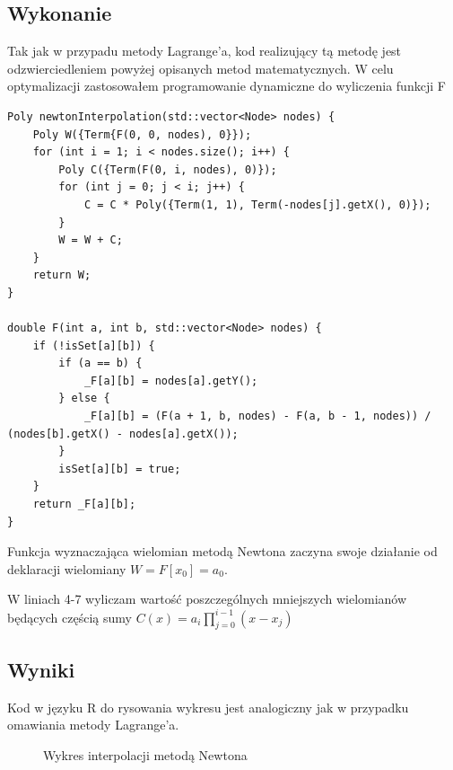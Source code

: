 \documentclass{article}
\begin{document}
    \subsection{Wykonanie}
    Tak jak w przypadu metody Lagrange'a, kod realizujący tą metodę jest odzwierciedleniem powyżej opisanych metod matematycznych. 
    W celu optymalizacji zastosowałem programowanie dynamiczne do wyliczenia funkcji F 
    \lstset {language=C++}
    \begin{lstlisting}[caption={Interpolacja metodą Newtona}]
Poly newtonInterpolation(std::vector<Node> nodes) {
    Poly W({Term{F(0, 0, nodes), 0}});
    for (int i = 1; i < nodes.size(); i++) {
        Poly C({Term(F(0, i, nodes), 0)});
        for (int j = 0; j < i; j++) {
            C = C * Poly({Term(1, 1), Term(-nodes[j].getX(), 0)});
        }
        W = W + C;
    }
    return W;
}

double F(int a, int b, std::vector<Node> nodes) {
    if (!isSet[a][b]) {
        if (a == b) {
            _F[a][b] = nodes[a].getY();
        } else {
            _F[a][b] = (F(a + 1, b, nodes) - F(a, b - 1, nodes)) / (nodes[b].getX() - nodes[a].getX());
        }
        isSet[a][b] = true;
    }
    return _F[a][b];
}
    \end{lstlisting}
    \vspace{5px}

    Funkcja wyznaczająca wielomian metodą Newtona zaczyna swoje działanie od deklaracji wielomiany $W=F[x_0]=a_0$.
    
    W liniach 4-7 wyliczam wartość poszczególnych mniejszych wielomianów będących częścią sumy $C(x)=a_i\prod^{i-1}_{j=0}(x-x_j)$

    \subsection{Wyniki}
    Kod w języku R do rysowania wykresu jest analogiczny jak w przypadku omawiania metody Lagrange'a.

    \begin{figure}[h]
        \caption{\label{fig:newtonPlot} Wykres interpolacji metodą Newtona}
    \end{figure}
\end{document}
